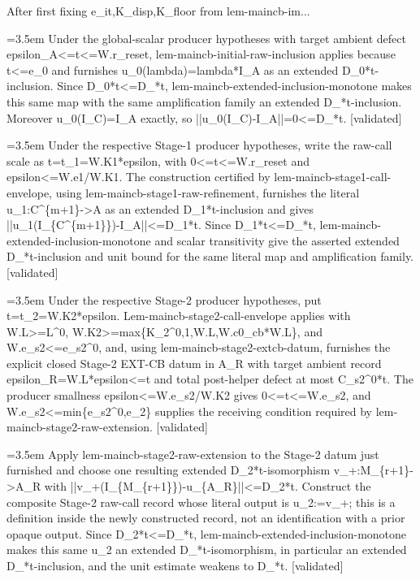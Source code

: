 \documentclass{article}
\newcommand{\step}[1]{\par\noindent\hangindent=3.5em\hangafter=1%
  \makebox[3.5em][l]{\textbf{#1.}}}
\newcommand{\steptag}[1]{\hfill{\small\textsf{[#1]}}}
\begin{document}
\begin{proofbox}{After first fixing e\_it,K\_disp,K\_floor from lem-maincb-im...}
\step{1.5} Under the global-scalar producer hypotheses with target ambient defect epsilon\_A<=t<=W.r\_reset, lem-maincb-initial-raw-inclusion applies because t<=e\_0 and furnishes u\_0(lambda)=lambda*I\_A as an extended D\_0*t-inclusion. Since D\_0*t<=D\_*t, lem-maincb-extended-inclusion-monotone makes this same map with the same amplification family an extended D\_*t-inclusion. Moreover u\_0(I\_C)=I\_A exactly, so ||u\_0(I\_C)-I\_A||=0<=D\_*t. \steptag{validated} \\[4pt]
\step{1.6} Under the respective Stage-1 producer hypotheses, write the raw-call scale as t=t\_1=W.K1*epsilon, with 0<=t<=W.r\_reset and epsilon<=W.e1/W.K1. The construction certified by lem-maincb-stage1-call-envelope, using lem-maincb-stage1-raw-refinement, furnishes the literal u\_1:C\textasciicircum{}\{m+1\}->A as an extended D\_1*t-inclusion and gives ||u\_1(I\_\{C\textasciicircum{}\{m+1\}\})-I\_A||<=D\_1*t. Since D\_1*t<=D\_*t, lem-maincb-extended-inclusion-monotone and scalar transitivity give the asserted extended D\_*t-inclusion and unit bound for the same literal map and amplification family. \steptag{validated} \\[4pt]
\step{1.7} Under the respective Stage-2 producer hypotheses, put t=t\_2=W.K2*epsilon. Lem-maincb-stage2-call-envelope applies with W.L>=L\textasciicircum{}0, W.K2>=max\{K\_2\textasciicircum{}0,1,W.L,W.c0\_cb*W.L\}, and W.e\_s2<=e\_s2\textasciicircum{}0, and, using lem-maincb-stage2-extcb-datum, furnishes the explicit closed Stage-2 EXT-CB datum in A\_R with target ambient record epsilon\_R=W.L*epsilon<=t and total post-helper defect at most C\_s2\textasciicircum{}0*t. The producer smallness epsilon<=W.e\_s2/W.K2 gives 0<=t<=W.e\_s2, and W.e\_s2<=min\{e\_s2\textasciicircum{}0,e\_2\} supplies the receiving condition required by lem-maincb-stage2-raw-extension. \steptag{validated} \\[4pt]
\step{1.8} Apply lem-maincb-stage2-raw-extension to the Stage-2 datum just furnished and choose one resulting extended D\_2*t-isomorphism v\_+:M\_\{r+1\}->A\_R with ||v\_+(I\_\{M\_\{r+1\}\})-u\_\{A\_R\}||<=D\_2*t. Construct the composite Stage-2 raw-call record whose literal output is u\_2:=v\_+; this is a definition inside the newly constructed record, not an identification with a prior opaque output. Since D\_2*t<=D\_*t, lem-maincb-extended-inclusion-monotone makes this same u\_2 an extended D\_*t-isomorphism, in particular an extended D\_*t-inclusion, and the unit estimate weakens to D\_*t. \steptag{validated} \\[4pt]

\end{proofbox}
\end{document}
